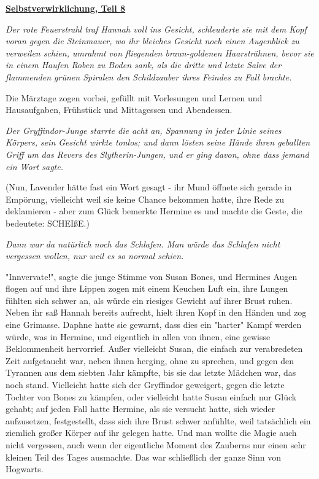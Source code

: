 

\hypertarget{selbstverwirklichung-teil-8}{%

\textbf{\uline{Selbstverwirklichung, Teil 8}}

\emph{Der rote Feuerstrahl traf Hannah voll ins Gesicht, schleuderte sie mit dem Kopf voran gegen die Steinmauer, wo ihr bleiches Gesicht noch einen Augenblick zu verweilen schien, umrahmt von fliegenden braun-goldenen Haarsträhnen, bevor sie in einem Haufen Roben zu Boden sank, als die dritte und letzte Salve der flammenden grünen Spiralen den Schildzauber ihres Feindes zu Fall brachte.}

Die Märztage zogen vorbei, gefüllt mit Vorlesungen und Lernen und Hausaufgaben, Frühstück und Mittagessen und Abendessen.

\emph{Der Gryffindor-Junge starrte die acht an, Spannung in jeder Linie seines Körpers, sein Gesicht wirkte tonlos; und dann lösten seine Hände ihren geballten Griff um das Revers des Slytherin-Jungen, und er ging davon, ohne dass jemand ein Wort sagte.}

(Nun, Lavender hätte fast ein Wort gesagt - ihr Mund öffnete sich gerade in Empörung, vielleicht weil sie keine Chance bekommen hatte, ihre Rede zu deklamieren - aber zum Glück bemerkte Hermine es und machte die Geste, die bedeutete: SCHEIßE.)

\emph{Dann war da natürlich noch das Schlafen. Man würde das Schlafen nicht vergessen wollen, nur weil es so normal schien.}

"Innvervate!", sagte die junge Stimme von Susan Bones, und Hermines Augen flogen auf und ihre Lippen zogen mit einem Keuchen Luft ein, ihre Lungen fühlten sich schwer an, als würde ein riesiges Gewicht auf ihrer Brust ruhen. Neben ihr saß Hannah bereits aufrecht, hielt ihren Kopf in den Händen und zog eine Grimasse. Daphne hatte sie gewarnt, dass dies ein "harter" Kampf werden würde, was in Hermine, und eigentlich in allen von ihnen, eine gewisse Beklommenheit hervorrief. Außer vielleicht Susan, die einfach zur verabredeten Zeit aufgetaucht war, neben ihnen herging, ohne zu sprechen, und gegen den Tyrannen aus dem siebten Jahr kämpfte, bis sie das letzte Mädchen war, das noch stand. Vielleicht hatte sich der Gryffindor geweigert, gegen die letzte Tochter von Bones zu kämpfen, oder vielleicht hatte Susan einfach nur Glück gehabt; auf jeden Fall hatte Hermine, als sie versucht hatte, sich wieder aufzusetzen, festgestellt, dass sich ihre Brust schwer anfühlte, weil tatsächlich ein ziemlich großer Körper auf ihr gelegen hatte. Und man wollte die Magie auch nicht vergessen, auch wenn der eigentliche Moment des Zauberns nur einen sehr kleinen Teil des Tages ausmachte. Das war schließlich der ganze Sinn von Hogwarts.

}
